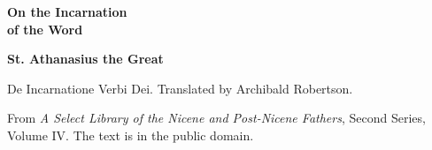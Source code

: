 \documentclass[11pt,letterpaper]{article}
\begin{document}
\color{ink}

\begin{titlepage}
\centering
\vspace*{4em}
{\LARGE\bfseries\color{heading} On the Incarnation\\[0.3em]of the Word\par}
\vspace{2em}
{\Large\bfseries\color{heading} St. Athanasius the Great\par}
\vspace{2.5em}
{\itshape\color{subhead}\parbox{0.8\linewidth}{\centering De Incarnatione Verbi Dei. Translated by Archibald Robertson.\par}}
\vfill
{\small From \emph{A Select Library of the Nicene and Post-Nicene Fathers}, Second Series, Volume IV. The text is in the public domain.\par}
\vspace{2em}
\end{titlepage}

\tableofcontents


\end{document}
